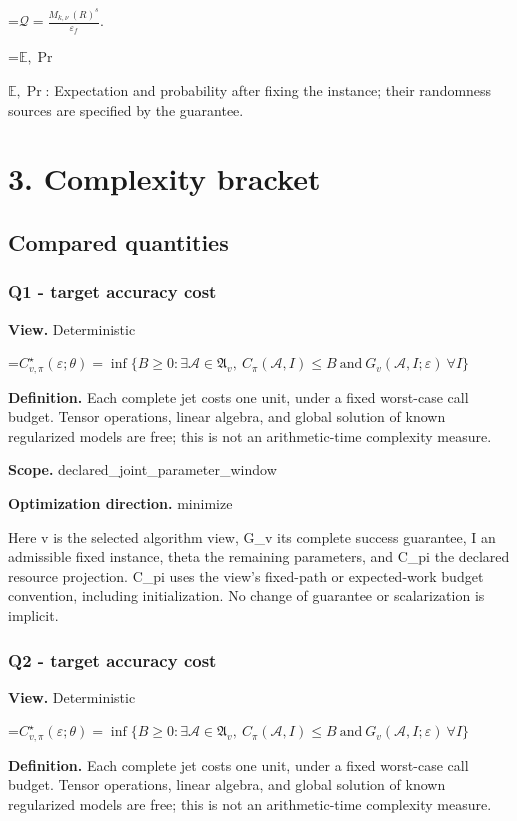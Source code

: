 \documentclass[10pt,a4paper]{article}
\newcommand{\AtlasMath}[1]{\par\begingroup\centering\setbox0=\hbox{$\displaystyle #1$}\ifdim\wd0>1.4\linewidth\typeout{ATLAS WIDE FORMULA: \the\wd0}\fi\ifdim\wd0>\linewidth\resizebox{\linewidth}{!}{\box0}\else\box0\fi\par\endgroup}
\newcommand{\AtlasInlineMath}[1]{\begingroup\setbox0=\hbox{$#1$}\ifdim\wd0>.4\linewidth\endgroup\AtlasMath{#1}\else\endgroup$#1$\fi}
\begin{document}
\AtlasMath{\mathcal{Q}=\frac{M_{k,\nu}\,(R)^{s}}{\varepsilon_f}.}


\AtlasInlineMath{\mathbb{E},\Pr}: Expectation and probability after fixing the instance; their randomness sources are specified by the guarantee.

\section{3. Complexity bracket}
\subsection{Compared quantities}
\subsubsection{Q1 - target accuracy cost}
\textbf{View.} Deterministic

\AtlasMath{C^\star_{v,\pi}(\varepsilon;\theta)=\inf\{B\ge0:\exists\mathcal A\in\mathfrak A_v,\ C_\pi(\mathcal A,I)\le B\ \text{and}\ G_v(\mathcal A,I;\varepsilon)\ \forall I\}}
\textbf{Definition.} Each complete jet costs one unit, under a fixed worst-case call budget. Tensor operations, linear algebra, and global solution of known regularized models are free; this is not an arithmetic-time complexity measure.

\textbf{Scope.} declared\_joint\_parameter\_window

\textbf{Optimization direction.} minimize

Here v is the selected algorithm view, G\_v its complete success guarantee, I an admissible fixed instance, theta the remaining parameters, and C\_pi the declared resource projection. C\_pi uses the view's fixed-path or expected-work budget convention, including initialization. No change of guarantee or scalarization is implicit.

\subsubsection{Q2 - target accuracy cost}
\textbf{View.} Deterministic

\AtlasMath{C^\star_{v,\pi}(\varepsilon;\theta)=\inf\{B\ge0:\exists\mathcal A\in\mathfrak A_v,\ C_\pi(\mathcal A,I)\le B\ \text{and}\ G_v(\mathcal A,I;\varepsilon)\ \forall I\}}
\textbf{Definition.} Each complete jet costs one unit, under a fixed worst-case call budget. Tensor operations, linear algebra, and global solution of known regularized models are free; this is not an arithmetic-time complexity measure.
\end{document}
